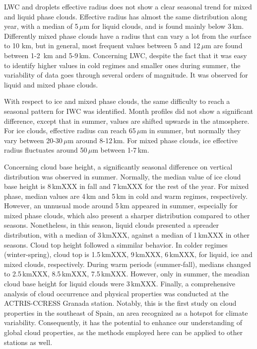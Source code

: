 \documentclass[journal abbreviation, manuscript]{copernicus}
\begin{document}
LWC and droplets effective radius does not show a clear seasonal trend for mixed and liquid phase clouds. Effective radius has almost the same distribution along year, with a median of 5\,$\mu$m for liquid clouds, and is found mainly below 3\,km. Differently mixed phase clouds have a radius that can vary a lot from the surface to 10 km, but in general, most frequent values between 5 and 12\,$\mu$m are found between 1-2 \,km and 5-9\,km. 
Concerning LWC, despite the fact that it was easy to identify higher values in cold regimes and smaller ones during summer, the variability of data goes through several orders of magnitude. It was observed for liquid and mixed phase clouds. 

With respect to ice and mixed phase clouds, the same difficulty to reach a seasonal pattern for IWC was identified. Month profiles did not show a significant difference, except that in summer, values are shifted upwards in the atmosphere. For ice clouds, effective radius can reach 65\,$\mu$m in summer, but normally they vary between 20-30\,$\mu$m around 8-12\,km.  For mixed phase clouds, ice effective radius fluctuates around 50\,$\mu$m between 1-7\,km.

Concerning cloud base height, a significantly seasonal difference on vertical distribution was observed in summer. Normally, the median value of ice cloud base height is 8\,kmXXX in fall and 7\,kmXXX for the rest of the year. For mixed phase, median values are 4\,km and 5\,km in cold and warm regimes, respectively. However, an unnusual mode around 5\,km appeared in summer, especially for mixed phase clouds, which also present a sharper distribution compared to other seasons. Nonetheless, in this season, liquid clouds presented a spreader distribution, with a median of 3\,kmXXX, against a median of 1\,kmXXX in other seasons. Cloud top height followed a simmilar behavior. In colder regimes (winter-spring), cloud top is 1.5\,kmXXX, 9\,kmXXX, 6\,kmXXX, for 
liquid, ice and mixed clouds, respectively. During warm periods (summer-fall), medians changed to 2.5\,kmXXX, 8.5\,kmXXX, 7.5\,kmXXX. However, only in summer, the meadian cloud base height for liquid clouds were 3\,kmXXX. Finally, a comprehensive analysis of cloud occurrence and physical properties was conducted at the ACTRIS-CCRESS Granada station. Notably, this is the first study on cloud properties in the southeast of Spain, an area recognized as a hotspot for climate variability. Consequently, it has the potential to enhance our understanding of global cloud properties, as the methods employed here can be applied to other stations as well.
\end{document}
